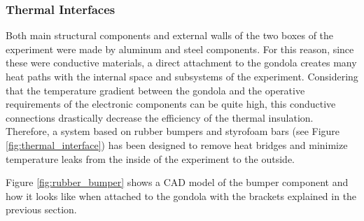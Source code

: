 \subsubsection{Thermal Interfaces}
\label{sec:4.2.2}

Both main structural components and external walls of the two boxes of the experiment were made by aluminum and steel components. For this reason, since these were conductive materials, a direct attachment to the gondola creates many heat paths with the internal space and subsystems of the experiment. Considering that the temperature gradient between the gondola and the operative requirements of the electronic components can be quite high, this conductive connections drastically decrease the efficiency of the thermal insulation. Therefore, a system based on rubber bumpers and styrofoam bars (see Figure \ref{fig:thermal_interface}) has been designed to remove heat bridges and minimize temperature leaks from the inside of the experiment to the outside.

Figure \ref{fig:rubber_bumper} shows a CAD model of the bumper component and how it looks like when attached to the gondola with the brackets explained in the previous section.

